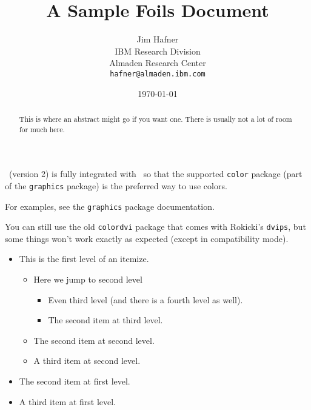 \documentclass[20pt,dvips]{foils}
\title{A Sample Foils Document}
\author{Jim Hafner\\
        IBM Research Division\\
        Almaden Research Center\\
        \texttt{hafner@almaden.ibm.com}
        }
\date{\today}
\begin{document}
\maketitle
\begin{abstract}
This is where an abstract might go if you want one.  There is usually
not a lot of room for much here.
\end{abstract}

\FoilTeX\ (version 2) is fully integrated with \LaTeXe\ so that the
supported \texttt{color} package (part of the \texttt{graphics}
package) is the preferred way to use colors.

For examples, see the \texttt{graphics} package documentation.

You can still use the old \texttt{colordvi} package that comes with
Rokicki's \texttt{dvips}, but some things won't work exactly as
expected (except in compatibility mode).

\LogoOff  %

\begin{itemize}
\item
This is the first level of an itemize.
  \begin{itemize}     %
  \item Here we jump to second level
     \begin{itemize}
     \item Even third level (and there is a fourth level as well).
     \item The second item at third level.
     \end{itemize}
  \item The second item at second level.
  \item A third item at second level.
  \end{itemize}
\item The second item at first level.
\item A third item at first level.
\end{itemize}
\end{document}
